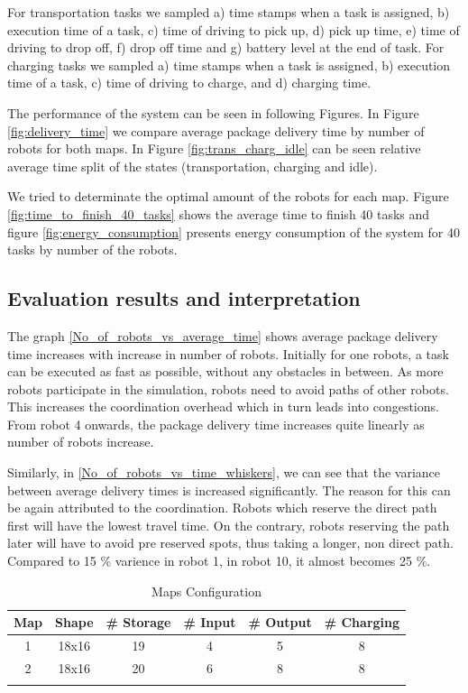 \documentclass[journal]{IEEEtran}
\begin{document}
For transportation tasks we sampled a) time stamps when a task is assigned, b) execution time of a task, c) time of driving to pick up, d) pick up time, e) time of driving to drop off, f) drop off time and g) battery level at the end of task. For charging tasks we sampled  a) time stamps when a task is assigned, b) execution time of a task, c) time of driving to charge, and d) charging time.

The performance of the system can be seen in following Figures. In Figure \ref{fig:delivery_time} we compare average package delivery time by number of robots for both maps. In Figure \ref{fig:trans_charg_idle} can be seen relative average time split of the states (transportation, charging and idle).

We tried to determinate the optimal amount of the robots for each map. Figure \ref{fig:time_to_finish_40_tasks} shows the average time to finish 40 tasks and figure \ref{fig:energy_consumption} presents energy consumption of the system for 40 tasks by number of the robots.

\subsection{Evaluation results and interpretation}

The graph \ref{No_of_robots_vs_average_time} shows average package delivery time increases with increase in number of robots.  Initially for one robots, a task can be executed as fast as possible, without any obstacles in between. As more robots participate in the simulation, robots need to avoid paths of other robots. This increases the coordination overhead which in turn leads into congestions. From robot 4 onwards, the package delivery time increases quite linearly as number of robots increase.

Similarly, in \ref{No_of_robots_vs_time_whiskers}, we can see that the variance between average delivery times is increased significantly. The reason for this can be again attributed to the coordination. Robots which reserve the direct path first will have the lowest travel time. On the contrary, robots reserving the path later will have to avoid pre reserved spots, thus taking a longer, non direct path. Compared to 15 \% varience in robot 1,  in robot 10, it almost becomes 25 \%.  

\begin{table}[h]
\caption{Maps Configuration}
\centering
\begin{tabular}{cccccc}
\hline
Map & Shape & \# Storage & \# Input             & \# Output & \# Charging \\ \hline
1   & 18x16 & 19         & 4                    & 5         & 8           \\
2   & 18x16 & 20         & 6                    & 8         & 8           \\ \hline
    &       &            & \multicolumn{1}{l}{} &           &            
\end{tabular}
\label{tab:maps}
\end{table}
\end{document}
